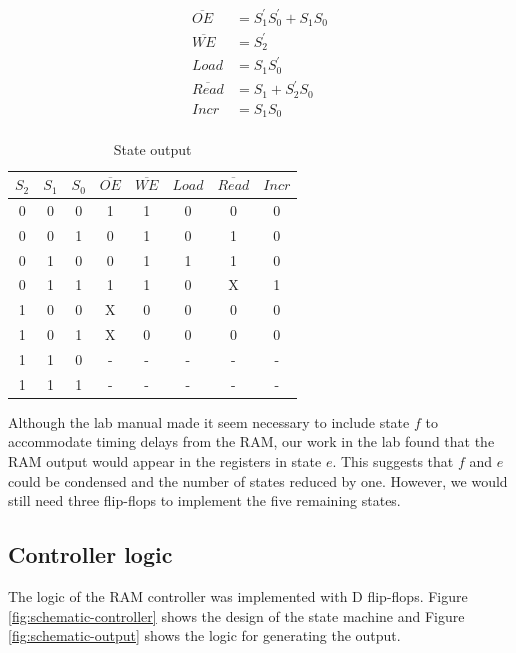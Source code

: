 \documentclass[11pt]{article}
\begin{document}
\begin{align*}
	\overline{OE} &= S_1^{\prime} S_0^{\prime} + S_1 S_0 \\
	\overline{WE} &= S_2^{\prime} \\
	Load &= S_1 S_0^{\prime} \\
	\overline{Read} &= S_1 + S_2^{\prime} S_0 \\
	Incr &= S_1 S_0 \\
\end{align*}

\begin{table}
	\centering
		\begin{tabular}{c c c | c c c c c }
			$S_2$ & $S_1$ & $S_0$ & $\overline{OE}$ & $\overline{WE}$ & $Load$ & $\overline{Read}$ & $Incr$\\
			\hline
			0 & 0 & 0 & 1 & 1 & 0 & 0 & 0 \\
			0 & 0 & 1 & 0 & 1 & 0 & 1 & 0 \\
			0 & 1 & 0 & 0 & 1 & 1 & 1 & 0 \\
			0 & 1 & 1 & 1 & 1 & 0 & X & 1 \\
			1 & 0 & 0 & X & 0 & 0 & 0 & 0 \\
			1 & 0 & 1 & X & 0 & 0 & 0 & 0 \\
			1 & 1 & 0 & - & - & - & - & - \\
			1 & 1 & 1 & - & - & - & - & - \\
		\end{tabular}
	\caption{State output}
	\label{table:state_output}
\end{table}

Although the lab manual made it seem necessary to include state $f$ to accommodate timing delays from the RAM, our work in the lab found that the RAM output would appear in the registers in state $e$. This suggests that $f$ and $e$ could be condensed and the number of states reduced by one. However, we would still need three flip-flops to implement the five remaining states.

\subsection{Controller logic}

The logic of the RAM controller was implemented with D flip-flops. Figure \ref{fig:schematic-controller} shows the design of the state machine and Figure \ref{fig:schematic-output} shows the logic for generating the output.
\end{document}
